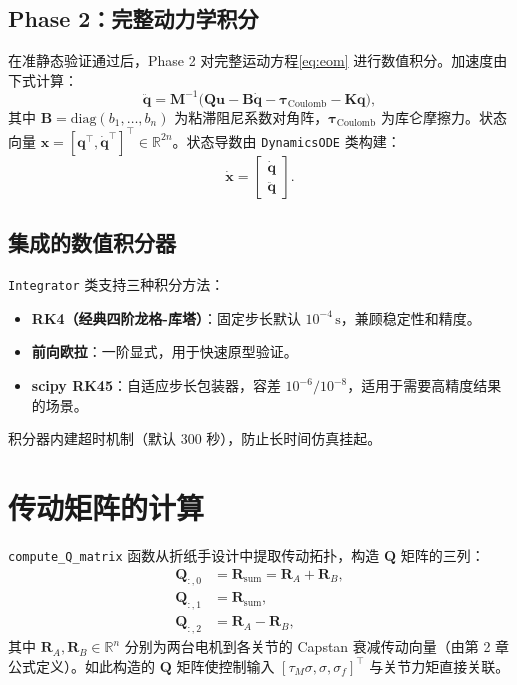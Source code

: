 \documentclass[12pt,a4paper]{article}
\newcommand{\R}{\mathbb{R}}
\begin{document}
\subsection{Phase 2：完整动力学积分}

在准静态验证通过后，Phase 2 对完整运动方程\eqref{eq:eom} 进行数值积分。加速度由下式计算：
\begin{equation}\label{eq:accel}
\ddot{\mathbf{q}} = \mathbf{M}^{-1}\bigl(\mathbf{Q}\mathbf{u} - \mathbf{B}\dot{\mathbf{q}} - \boldsymbol{\tau}_{\text{Coulomb}} - \mathbf{K}\mathbf{q}\bigr),
\end{equation}
其中 $\mathbf{B}=\text{diag}(b_1,\dots,b_n)$ 为粘滞阻尼系数对角阵，$\boldsymbol{\tau}_{\text{Coulomb}}$ 为库仑摩擦力。状态向量 $\mathbf{x}=[\mathbf{q}^\top,\dot{\mathbf{q}}^\top]^\top\in\R^{2n}$。状态导数由 \texttt{DynamicsODE} 类构建：
\begin{equation}\label{eq:rhs}
\dot{\mathbf{x}} = \begin{bmatrix}
\dot{\mathbf{q}} \\
\ddot{\mathbf{q}}
\end{bmatrix}.
\end{equation}

\subsection{集成的数值积分器}

\texttt{Integrator} 类支持三种积分方法：
\begin{itemize}
    \item \textbf{RK4（经典四阶龙格-库塔）}：固定步长默认 $10^{-4}\,\text{s}$，兼顾稳定性和精度。
    \item \textbf{前向欧拉}：一阶显式，用于快速原型验证。
    \item \textbf{scipy RK45}：自适应步长包装器，容差 $10^{-6}/10^{-8}$，适用于需要高精度结果的场景。
\end{itemize}
积分器内建超时机制（默认 300 秒），防止长时间仿真挂起。

\section{传动矩阵的计算}

\texttt{compute\_Q\_matrix} 函数从折纸手设计中提取传动拓扑，构造 $\mathbf{Q}$ 矩阵的三列：
\begin{align*}
\mathbf{Q}_{:,0} &= \mathbf{R}_{\text{sum}} = \mathbf{R}_A + \mathbf{R}_B, \\
\mathbf{Q}_{:,1} &= \mathbf{R}_{\text{sum}}, \\
\mathbf{Q}_{:,2} &= \mathbf{R}_A - \mathbf{R}_B,
\end{align*}
其中 $\mathbf{R}_A,\mathbf{R}_B\in\R^n$ 分别为两台电机到各关节的 Capstan 衰减传动向量（由第 2 章公式定义）。如此构造的 $\mathbf{Q}$ 矩阵使控制输入 $[\tau_M\sigma,\sigma,\sigma_f]^\top$ 与关节力矩直接关联。
\end{document}
